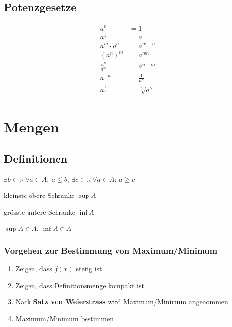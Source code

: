 \documentclass[11pt]{article}
\begin{document}
\subsection{Potenzgesetze}

\begin{equation*}
\begin{split}
	a^0 & = 1 \\
	a^1 & = a \\
	a^m \cdot a^n & = a^{m+n} \\
	(a^n)^m & = a^{nm} \\
	\frac{a^n}{a^m} & = a^{n-m} \\
	a^{-n} & = \frac{1}{a^n} \\
	a^{\frac{b}{n}} & = \sqrt[n]	{a^b} \\
\end{split}
\end{equation*}

\section{Mengen}

\subsection{Definitionen}

\begin{description}[labelindent=16pt,style=multiline,leftmargin=6cm, noitemsep]
	\item[Obere/Untere Schranke:] $\exists b \in \mathbb{R}\ \forall a\in A:\ a \leq b$, $\exists c \in \mathbb{R}\ \forall a\in A:\ a \geq c$
	\item[Supremum:] kleinste obere Schranke $\sup A$
	\item[Infimum:] gr{\"o}sste untere Schranke $\inf A$
	\item[Maximum/Minimum:] $\sup A \in A$, $\inf A \in A$
\end{description}

\subsubsection{Vorgehen zur Bestimmung von Maximum/Minimum}

\begin{enumerate}[noitemsep]
	\item Zeigen, dass $f(x)$ stetig ist
	\item Zeigen, dass Definitionsmenge kompakt ist
	\item Nach \textbf{Satz von Weierstrass} wird Maximum/Minimum angenommen
	\item Maximum/Minimum bestimmen
\end{enumerate}
\end{document}

